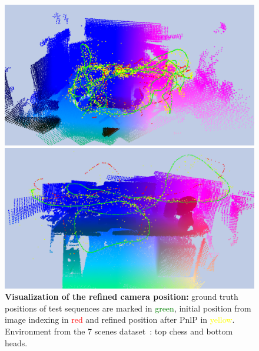 \begin{figure}
    \centering

	\includegraphics[width=\linewidth]{results/models/chess}
	
	\includegraphics[width=\linewidth]{results/models/heads}
	
	\caption[Refined position visualization -- 2]{\label{fig:res_visualization2} \textbf{Visualization of the refined camera position:} ground truth positions of test sequences are marked in \textcolor{green}{green}, initial position from image indexing in \textcolor{red}{red} and refined position after PnlP in \textcolor{yellow}{yellow}. Environment from the 7 scenes dataset~\citep{Shotton2013}: top chess and bottom heads.}
	
\end{figure}